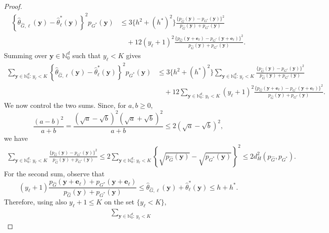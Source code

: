 \documentclass[twoside,12pt]{article}
\begin{document}
\begin{proof}
\begin{align*}
\left\{
\hat\theta_{\widehat G,\ell}(\boldsymbol y)
-
\hat\theta_\ell^\ast(\boldsymbol y)
\right\}^2
p_{G^\ast}(\boldsymbol y)
&\leq
3\{h^2+(h^\ast)^2\}
\frac{
\{p_{\widehat G}(\boldsymbol y)-p_{G^\ast}(\boldsymbol y)\}^2
}{
p_{\widehat G}(\boldsymbol y)+p_{G^\ast}(\boldsymbol y)
}
\\
&\quad
+
12(y_\ell+1)^2
\frac{
\{p_{\widehat G}(\boldsymbol y+\boldsymbol e_\ell)
-
p_{G^\ast}(\boldsymbol y+\boldsymbol e_\ell)\}^2
}{
p_{\widehat G}(\boldsymbol y)+p_{G^\ast}(\boldsymbol y)
}.
\end{align*}
Summing over $\boldsymbol y\in\mathbb N_0^d$ such that $y_\ell<K$ gives
\[
\begin{aligned}
\sum_{\boldsymbol y\in\mathbb N_0^d:\,y_\ell<K}
\left\{
\hat\theta_{\widehat G,\ell}(\boldsymbol y)
-
\hat\theta_\ell^\ast(\boldsymbol y)
\right\}^2
p_{G^\ast}(\boldsymbol y)
&\leq
3\{h^2+(h^\ast)^2\}
\sum_{\boldsymbol y\in\mathbb N_0^d:\,y_\ell<K}
\frac{
\{p_{\widehat G}(\boldsymbol y)-p_{G^\ast}(\boldsymbol y)\}^2
}{
p_{\widehat G}(\boldsymbol y)+p_{G^\ast}(\boldsymbol y)
}
\\
&\quad
+
12
\sum_{\boldsymbol y\in\mathbb N_0^d:\,y_\ell<K}
(y_\ell+1)^2
\frac{
\{p_{\widehat G}(\boldsymbol y+\boldsymbol e_\ell)
-
p_{G^\ast}(\boldsymbol y+\boldsymbol e_\ell)\}^2
}{
p_{\widehat G}(\boldsymbol y)+p_{G^\ast}(\boldsymbol y)
}.
\end{aligned}
\]
We now control the two sums. Since, for $a,b\geq0$,
\[
\frac{(a-b)^2}{a+b}
=
\frac{(\sqrt a-\sqrt b)^2(\sqrt a+\sqrt b)^2}{a+b}
\leq
2(\sqrt a-\sqrt b)^2,
\]
we have
\begin{align*}
\sum_{\boldsymbol y\in\mathbb N_0^d:\,y_\ell<K}
\frac{
\{p_{\widehat G}(\boldsymbol y)-p_{G^\ast}(\boldsymbol y)\}^2
}{
p_{\widehat G}(\boldsymbol y)+p_{G^\ast}(\boldsymbol y)
}
\leq
2
\sum_{\boldsymbol y\in\mathbb N_0^d:\,y_\ell<K}
\left\{
\sqrt{p_{\widehat G}(\boldsymbol y)}
-
\sqrt{p_{G^\ast}(\boldsymbol y)}
\right\}^2
\leq
2d_H^2(p_{\widehat G},p_{G^\ast}).
\end{align*}
For the second sum, observe that
\[
(y_\ell+1)
\frac{
p_{\widehat G}(\boldsymbol y+\boldsymbol e_\ell)
+
p_{G^\ast}(\boldsymbol y+\boldsymbol e_\ell)
}{
p_{\widehat G}(\boldsymbol y)+p_{G^\ast}(\boldsymbol y)
}
\leq \hat\theta_{\widehat G,\ell}(\boldsymbol y)+ \hat\theta_\ell^\ast(\boldsymbol y)\leq 
h+h^\ast.
\]
Therefore, using also $y_\ell+1\leq K$ on the set $\{y_\ell<K\}$,
\begin{align*}
&\sum_{\boldsymbol y\in\mathbb N_0^d:\,y_\ell<K}

\end{align*}
\end{proof}
\end{document}
